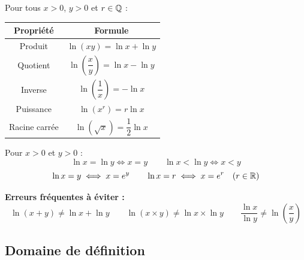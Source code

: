 \begin{propriete}
  Pour tous $x > 0$, $y > 0$ et $r \in \mathbb{Q}$ :

  \bigskip
  \begin{center}
  \renewcommand{\arraystretch}{2}
  \begin{tabular}{|c|c|}
    \hline
    \textbf{\color{navy}Propri\'{e}t\'{e}}
      & \textbf{\color{navy}Formule} \\
    \hline\hline
    Produit
      & $\ln(xy) = \ln x + \ln y$ \\
    \hline
    Quotient
      & $\ln\!\left(\dfrac{x}{y}\right) = \ln x - \ln y$ \\
    \hline
    Inverse
      & $\ln\!\left(\dfrac{1}{x}\right) = -\ln x$ \\
    \hline
    Puissance
      & $\ln(x^r) = r\ln x$ \\
    \hline
    Racine carr\'{e}e
      & $\ln(\sqrt{x}) = \dfrac{1}{2}\ln x$ \\
    \hline
  \end{tabular}
  \end{center}
\end{propriete}

\begin{propriete}
  Pour $x > 0$ et $y > 0$ :
  \[
    \ln x = \ln y \iff x = y \qquad
    \ln x < \ln y \iff x < y
  \]
  \[
    \ln x = y \iff x = e^y \qquad
    \ln x = r \iff x = e^r \quad (r \in \mathbb{R})
  \]
\end{propriete}

\begin{attention}
  \textbf{Erreurs fr\'{e}quentes \`{a} \'{e}viter :}
  \[
    \ln(x + y) \neq \ln x + \ln y \qquad
    \ln(x \times y) \neq \ln x \times \ln y \qquad
    \frac{\ln x}{\ln y} \neq \ln\!\left(\frac{x}{y}\right)
  \]
\end{attention}

\subsection{Domaine de d\'{e}finition}

